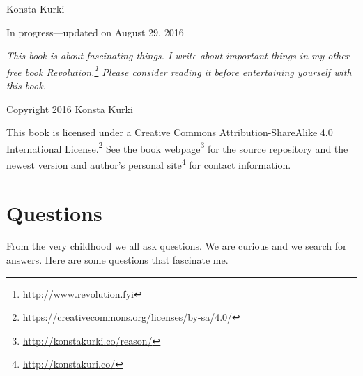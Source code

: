 \documentclass[11pt,oneside,%
]{memoir}
\begin{document}
\frontmatter

\thispagestyle{empty}


\vspace{0.3in}

\noindent Konsta Kurki

\vspace{0.3in}

\noindent In progress---updated on August 29, 2016

\vfill

\noindent\emph{This book is about fascinating things. I write about important things in my other free book \emph{Revolution}.\footnote{\url{http://www.revolution.fyi}} Please consider reading it before entertaining yourself with this book.}

\vfill

\noindent Copyright {\textcopyright} 2016 Konsta Kurki

\vspace{0.18in}

\noindent This book is licensed under a Creative Commons Attribution-ShareAlike 4.0 International License.\footnote{\url{https://creativecommons.org/licenses/by-sa/4.0/}} See the book webpage\footnote{\url{http://konstakurki.co/reason/}} for the source repository and the newest version and author's personal site\footnote{\url{http://konstakuri.co/}} for contact information.

\newpage

\mainmatter

\tableofcontents

\chapter{Questions}

From the very childhood we all ask questions. We are curious and we search for answers. Here are some questions that fascinate me.
\end{document}
